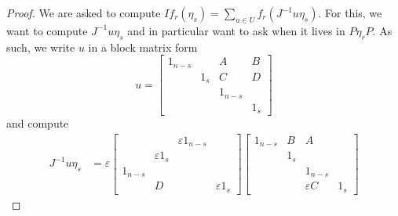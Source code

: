 \begin{proof}
	We are asked to compute $If_r(\eta_s)=\sum_{u\in U}f_r\left(J^{-1}u\eta_s\right)$. For this, we want to compute $J^{-1}u\eta_s$ and in particular want to ask when it lives in $P\eta_rP$. As such, we write $u$ in a block matrix form
    \[u=\begin{bmatrix}
			1_{n-s} && A & B \\ & 1_s & C & D \\
			&& 1_{n-s} \\ &&& 1_s
		\end{bmatrix}\]
    and compute
	\begin{align*}
		J^{-1}u\eta_s
		&= \varepsilon\begin{bmatrix}
			&& \varepsilon1_{n-s} \\ & \varepsilon1_s \\
			1_{n-s} &   &   \\ & D &   & \varepsilon1_s
		\end{bmatrix}\begin{bmatrix}
			1_{n-s} & B & A \\ & 1_s \\
			&& 1_{n-s} \\ && \varepsilon C & 1_s

\end{bmatrix}
\end{align*}
\end{proof}
